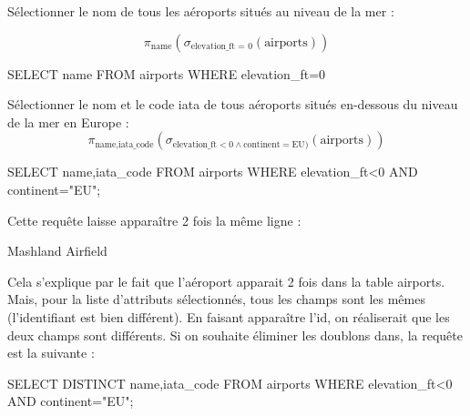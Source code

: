 \documentclass[10pt,fleqn]{article} %
\begin{document}
\begin{exemple}
Sélectionner le nom de tous les aéroports situés au niveau de la mer :

\ifprof
$$
\pi_{\text{name}}\left(\sigma_{\text{elevation\_ft = 0}}(\text{airports})\right)
$$
\begin{envsql}
\begin{sql}
SELECT name FROM airports WHERE elevation_ft=0
\end{sql}
\end{envsql}
\else
\vspace{3cm}
\fi

Sélectionner le nom et le code iata de tous aéroports situés en-dessous du niveau de la mer en Europe :
\ifprof
$$
\pi_{\text{name},\text{iata\_code}}\left(\sigma_{\text{elevation\_ft} < \text{0}\wedge \text{continent}=\text{EU})}(\text{airports} )\right)
$$
\begin{envsql}
\begin{sql}
SELECT name,iata_code FROM airports WHERE elevation_ft<0 AND continent="EU";
\end{sql}
\end{envsql}
\else
\vspace{3cm}
\fi


Cette requête laisse apparaître 2 fois la même ligne : 
\begin{sql}
Mashland Airfield   
\end{sql}
Cela s'explique par le fait que l'aéroport apparait 2 fois dans la table airports. Mais, pour la liste d'attributs sélectionnés, tous les champs sont les mêmes (l'identifiant est bien différent). En faisant apparaître l'id, on réaliserait que les deux champs sont différents. 
Si on souhaite éliminer les doublons dans, la requête est la suivante : 

\begin{envsql}
\begin{sql}
SELECT DISTINCT name,iata_code FROM airports WHERE elevation_ft<0 AND continent="EU";
\end{sql}

\end{envsql}

\end{exemple}
\end{document}
